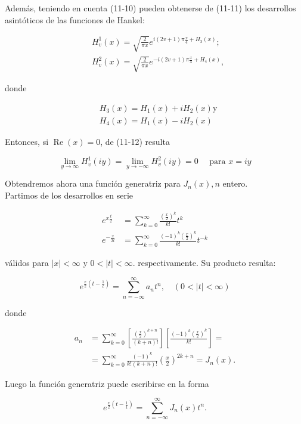 \documentclass[10pt]{article}
\theoremstyle{plain}
\theoremstyle{definition}
\theoremstyle{remark}
\begin{document}
Además, teniendo en cuenta (11-10) pueden obtenerse de (11-11) los desarrollos asintóticos de las funciones de Hankel:


\begin{align*}
& H_{v}^{1}(x)=\sqrt{\frac{2}{\pi x}} e^{i(2 v+1) \pi \frac{x}{4}+H_{3}(x)} ; \\
& H_{v}^{2}(x)=\sqrt{\frac{2}{\pi x}} e^{-i(2 v+1) \pi \frac{x}{4}+H_{4}(x)}, \tag{11-12}
\end{align*}


donde

$$
\begin{aligned}
& H_{3}(x)=H_{1}(x)+i H_{2}(x) \mathrm{y} \\
& H_{4}(x)=H_{1}(x)-i H_{2}(x)
\end{aligned}
$$

Entonces, si $\operatorname{Re}(x)=0$, de (11-12) resulta

$$
\lim _{y \rightarrow \infty} H_{v}^{1}(i y)=\lim _{y \rightarrow-\infty} H_{v}^{2}(i y)=0 \quad \text { para } x=i y
$$

Obtendremos ahora una función generatriz para $J_{n}(x), n$ entero.\\
Partimos de los desarrollos en serie

$$
\begin{aligned}
e^{x \frac{t}{2}} & =\sum_{k=0}^{\infty} \frac{\left(\frac{x}{2}\right)^{k}}{k!} t^{k} \\
e^{-\frac{x}{2 t}} & =\sum_{k=0}^{\infty} \frac{(-1)^{k}\left(\frac{x}{2}\right)^{k}}{k!} t^{-k}
\end{aligned}
$$

válidos para $|x|<\infty$ y $0<|t|<\infty$. respectivamente. Su producto resulta:

$$
e^{\frac{x}{2}\left(t-\frac{1}{t}\right)}=\sum_{n=-\infty}^{\infty} a_{n} t^{n}, \quad(0<|t|<\infty)
$$

donde

$$
\begin{aligned}
a_{n} & =\sum_{k=0}^{\infty}\left[\frac{\left(\frac{x}{2}\right)^{k+n}}{(k+n)!}\right]\left[\frac{(-1)^{k}\left(\frac{x}{2}\right)^{k}}{k!}\right]= \\
& =\sum_{k=0}^{\infty} \frac{(-1)^{k}}{k!(k+n)!}\left(\frac{x}{2}\right)^{2 k+n}=J_{n}(x) .
\end{aligned}
$$

Luego la función generatriz puede escribirse en la forma


\begin{equation*}
e^{\frac{x}{2}\left(t-\frac{1}{t}\right)}=\sum_{n=-\infty}^{\infty} J_{n}(x) t^{n} . \tag{11-13}
\end{equation*}
\end{document}
